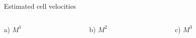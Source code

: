 \documentclass[mathserif,11pt]{beamer}
\begin{document}
\begin{frame}{Estimated cell velocities}
\begin{columns}
	\begin{column}{0.32\textwidth}
		\scalebox{0.7}{}\vfil
		\scalebox{0.7}{}
	\end{column}
	\begin{column}{0.3\textwidth}
		\scalebox{0.7}{}\vfil
		\scalebox{0.7}{}
	\end{column}
	\begin{column}{0.3\textwidth}
		\scalebox{0.7}{}\vfil
		\scalebox{0.7}{}
	\end{column}
\end{columns}
\begin{columns}
	\centering
	\begin{column}{0.3\textwidth}
		\centering
		\footnotesize{ a) $M^1$}
	\end{column}
	\begin{column}{0.3\textwidth}
		\centering
		\footnotesize{ b) $M^2$}
	\end{column}
	\begin{column}{0.3\textwidth}
		\centering
		\footnotesize{ c) $M^3$}
	\end{column}
\end{columns}
\end{frame} 
\end{document}
